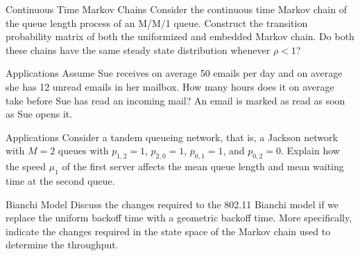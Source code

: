 \begin{problem}{Continuous Time Markov Chains}
Consider the continuous time Markov chain of the queue length process of an M/M/1 queue. Construct the transition probability matrix of both the uniformized and embedded Markov chain. Do both these chains have the same steady state distribution whenever $\rho < 1$?
\end{problem}

\begin{problem}{Applications}
Assume Sue receives on average 50 emails per day and on average she has 12 unread emails in her mailbox. How many hours does it on average take before Sue has read an incoming mail? An email is marked as read as soon as Sue opens it.
\end{problem}

\begin{problem}{Applications}
Consider a tandem queueing network, that is, a Jackson network with $M = 2$ queues with $p_{1,2} = 1$, $p_{2,0} = 1$, $p_{0,1} = 1$, and $p_{0,2} = 0$. Explain how the speed $\mu_1$ of the first server affects the mean queue length and mean waiting time at the second queue.
\end{problem}

\begin{problem}{Bianchi Model}
Discuss the changes required to the 802.11 Bianchi model if we replace the uniform backoff time with a geometric backoff time. More specifically, indicate the changes required in the state space of the Markov chain used to determine the throughput.
\end{problem}
